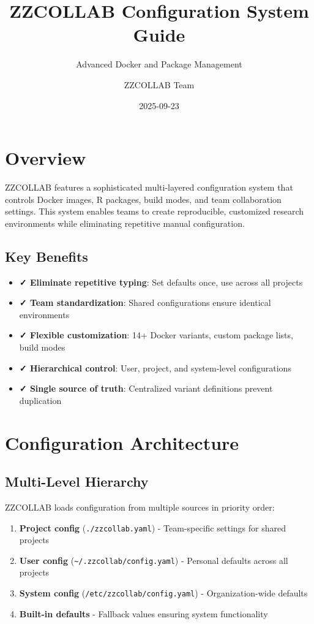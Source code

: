 \documentclass[
]{article}
\title{ZZCOLLAB Configuration System Guide}
\subtitle{Advanced Docker and Package Management}
\author{ZZCOLLAB Team}
\date{2025-09-23}
\providecommand{\tightlist}{%
  \setlength{\itemsep}{0pt}\setlength{\parskip}{0pt}}
\begin{document}
\maketitle

{
\setcounter{tocdepth}{3}
\tableofcontents
}
\section{Overview}\label{overview}

ZZCOLLAB features a sophisticated multi-layered configuration system
that controls Docker images, R packages, build modes, and team
collaboration settings. This system enables teams to create
reproducible, customized research environments while eliminating
repetitive manual configuration.

\subsection{Key Benefits}\label{key-benefits}

\begin{itemize}
\tightlist
\item
  \textbf{✓ Eliminate repetitive typing}: Set defaults once, use across
  all projects
\item
  \textbf{✓ Team standardization}: Shared configurations ensure
  identical environments
\item
  \textbf{✓ Flexible customization}: 14+ Docker variants, custom package
  lists, build modes
\item
  \textbf{✓ Hierarchical control}: User, project, and system-level
  configurations
\item
  \textbf{✓ Single source of truth}: Centralized variant definitions
  prevent duplication
\end{itemize}

\section{Configuration Architecture}\label{configuration-architecture}

\subsection{Multi-Level Hierarchy}\label{multi-level-hierarchy}

ZZCOLLAB loads configuration from multiple sources in priority order:

\begin{enumerate}
\def\labelenumi{\arabic{enumi}.}
\tightlist
\item
  \textbf{Project config} (\texttt{./zzcollab.yaml}) - Team-specific
  settings for shared projects
\item
  \textbf{User config}
  (\texttt{\textasciitilde{}/.zzcollab/config.yaml}) - Personal defaults
  across all projects
\item
  \textbf{System config} (\texttt{/etc/zzcollab/config.yaml}) -
  Organization-wide defaults
\item
  \textbf{Built-in defaults} - Fallback values ensuring system
  functionality
\end{enumerate}
\end{document}
